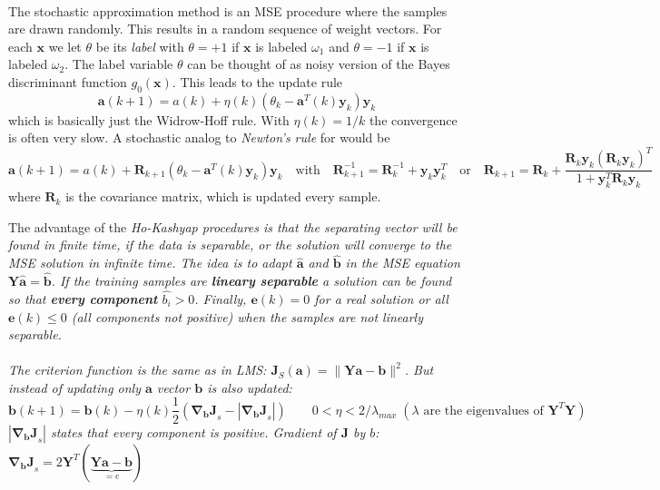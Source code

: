  	\\
    The stochastic approximation method is an MSE procedure where the samples are drawn randomly.
    This results in a random sequence of weight vectors.
 	For each $\bm x$ we let $\theta$ be its \emph{label} with $\theta=+1$ if $\bm x$ is labeled $\omega_1$ and $\theta=-1$ if $\bm x$ is labeled $\omega_2$.
 	The label variable $\theta$ can be thought of as noisy version of the Bayes discriminant function $g_0(\bm x)$.
    This leads to the update rule
    \begin{equation*}
        \bm a(k+1)=a(k)+\eta(k)(\theta_k - \bm a^T(k)\bm y_k)\bm y_k
    \end{equation*}
  	which is basically just the Widrow-Hoff rule.
  	With $\eta(k)=1/k$ the convergence is often very slow.
  	A stochastic analog to \emph{Newton's rule} for would be
  	\begin{equation*}
     	\bm a(k+1)=a(k)+\bm R_{k+1}(\theta_k - \bm a^T(k)\bm y_k)\bm y_k
     	\quad \text{with} \quad 
     	\bm R_{k+1}^{-1}= \bm R_{k}^{-1} + \bm y_k \bm y_k^T
     	\quad \text{or} \quad
     	\bm R_{k+1}= \bm R_{k} + \frac{\bm R_{k} \bm y_k(\bm R_{k} \bm y_k)^T}{1+\bm y_k^T \bm R_{k} \bm y_k}
 	\end{equation*}
 	where $\bm R_{k}$ is the covariance matrix, which is updated every sample.
 	
 	
 	The advantage of the \em Ho-Kashyap procedures \em is that the separating vector will be found in finite time, if the data is separable, or the 
 	solution will converge to the MSE solution in infinite time.
 	The idea is to adapt $\hat{\bm a}$ and $\hat{\bm b}$ in the MSE equation $\bm Y \hat{\bm a} = \hat{\bm b}$.
 	If the training samples are \textbf{lineary separable} a solution can be found so that 
 	\textbf{every component} $\hat{b_i}> 0$. Finally, $\bm e(k) = 0$ for a real solution or 
 	all $\bm e(k) \leq 0$ (all components not positive) when the samples are not linearly separable.\\
 	
 	\\
 	The criterion function is the same as in LMS: $\bm J_S(\bm a)=\|\bm Y \bm a - \bm b \|^2$. 
 	But instead of updating only $\bm a$ vector $\bm b$ is also updated:
 	$$ \bm b(k+1)=\bm b(k)- \eta(k) \frac{1}{2} \left(\bm{\nabla_b J}_s - |\bm{\nabla_b J}_s|\right) \qquad 
 	0 <\eta < 2/\lambda_{max} \; (\lambda \text{ are the eigenvalues of } \bm Y^T \bm Y)$$
 	$|\bm{\nabla_b J}_s|$ states that every component is positive. 
 	Gradient of $\bm J$ by $b$: $\bm{\nabla_b J}_s = 2\bm Y^T(\underbrace{\bm{Y a - b}}_{=e})$
 	

